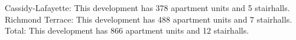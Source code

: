 {Cassidy-Lafayette}: This development has 378 apartment units and 5 stairhalls.\\{Richmond Terrace}: This development has 488 apartment units and 7 stairhalls.\\{Total}: This development has 866 apartment units and 12 stairhalls.\\